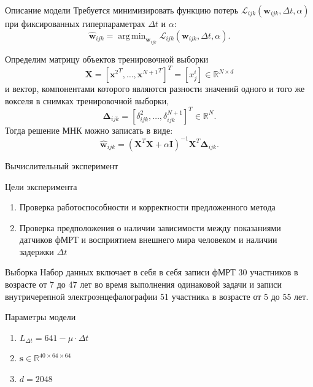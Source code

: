 \documentclass[9pt,pdf]{beamer} %
\DeclareMathOperator*{\argmin}{arg\,min}  %
\begin{document}
\begin{frame}{Описание модели}
Требуется минимизировать функцию потерь $\mathcal{L}_{ijk}(\bm{w}_{ijk}, \Delta t, \alpha)$ при фиксированных гиперпараметрах $\Delta t$ и $\alpha$:
\begin{equation*}
	\label{main_Problem}
	\hat{\bm{w}}_{ijk} = \argmin_{\bm{w}_{ijk}} \mathcal{L}_{ijk}(\bm{w}_{ijk}, \Delta t, \alpha).
\end{equation*}

Определим матрицу объектов тренировочной выборки
\begin{equation*}
\label{X}
    \bm{X} = [{\bm{x}^2}^T, \dots, {\bm{x}^{N+1}}^T]^T = [x^i_j] \in \mathbb{R}^{N \times d}
\end{equation*}
и вектор, компонентами которого являются разности значений одного и того же вокселя в снимках тренировочной выборки,
\begin{equation*}
\label{Delta}
    \bm{\Delta}_{ijk} = [\delta^{2}_{ijk}, \dots, \delta^{N+1}_{ijk}]^T \in \mathbb{R}^{N}.
\end{equation*}
Тогда решение МНК можно записать в виде:
\begin{equation*}
\label{weights}
    \hat{\bm{w}}_{ijk} = (\bm{X}^T \bm{X} + \alpha \mathbf{I})^{-1} \bm{X}^T \bm{\Delta}_{ijk}.
\end{equation*}

\end{frame}
\begin{frame}{Вычислительный эксперимент}
\begin{block}{Цели эксперимента}
\begin{enumerate}
    \item Проверка работоспособности и корректности предложенного метода
    \item Проверка предположения о наличии зависимости между показаниями датчиков фМРТ и восприятием внешнего мира человеком и наличии задержки $\Delta t$
    
\end{enumerate}
\end{block}
\begin{block}{Выборка} 
Набор данных включает в себя в себя записи фМРТ 30 участников в возрасте от 7 до 47 лет во время выполнения одинаковой задачи и записи внутричерепной электроэнцефалографии 51 участникa в возрасте от 5 до 55 лет. 

\end{block}
\begin{block}{Параметры модели} 
\begin{enumerate}
    \item $L_{\Delta t} = 641-\mu \cdot \Delta t$ 
    \item $\bm{s} \in \mathbb{R}^{{40} \times {64} \times {64}}$
    \item $d = 2048$
\end{enumerate}
\end{block}
\end{frame}
\end{document}
